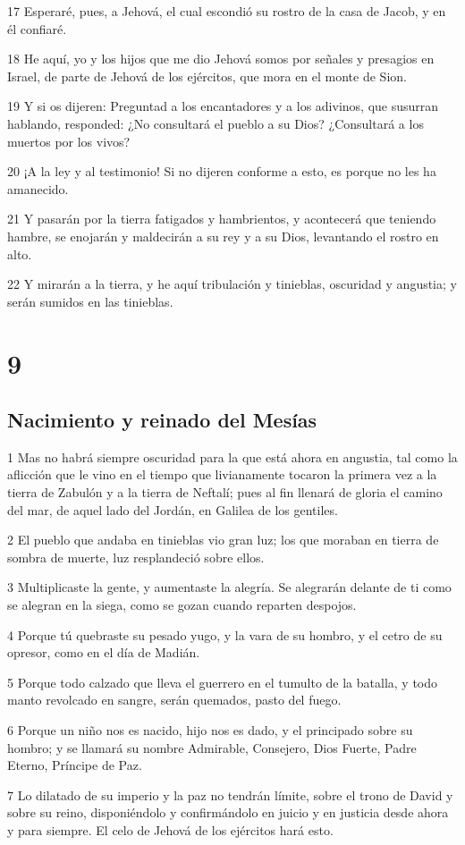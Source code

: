 \par 17 Esperaré, pues, a Jehová, el cual escondió su rostro de la casa de Jacob, y en él confiaré. 
\par 18 He aquí, yo y los hijos que me dio Jehová somos por señales y presagios en Israel, de parte de Jehová de los ejércitos, que mora en el monte de Sion.
\par 19 Y si os dijeren: Preguntad a los encantadores y a los adivinos, que susurran hablando, responded: ¿No consultará el pueblo a su Dios? ¿Consultará a los muertos por los vivos?
\par 20 ¡A la ley y al testimonio! Si no dijeren conforme a esto, es porque no les ha amanecido.
\par 21 Y pasarán por la tierra fatigados y hambrientos, y acontecerá que teniendo hambre, se enojarán y maldecirán a su rey y a su Dios, levantando el rostro en alto.
\par 22 Y mirarán a la tierra, y he aquí tribulación y tinieblas, oscuridad y angustia; y serán sumidos en las tinieblas.

\chapter{9}

\section*{Nacimiento y reinado del Mesías}

\par 1 Mas no habrá siempre oscuridad para la que está ahora en angustia, tal como la aflicción que le vino en el tiempo que livianamente tocaron la primera vez a la tierra de Zabulón y a la tierra de Neftalí; pues al fin llenará de gloria el camino del mar, de aquel lado del Jordán, en Galilea de los gentiles. 
\par 2 El pueblo que andaba en tinieblas vio gran luz; los que moraban en tierra de sombra de muerte, luz resplandeció sobre ellos. 
\par 3 Multiplicaste la gente, y aumentaste la alegría. Se alegrarán delante de ti como se alegran en la siega, como se gozan cuando reparten despojos.
\par 4 Porque tú quebraste su pesado yugo, y la vara de su hombro, y el cetro de su opresor, como en el día de Madián.
\par 5 Porque todo calzado que lleva el guerrero en el tumulto de la batalla, y todo manto revolcado en sangre, serán quemados, pasto del fuego.
\par 6 Porque un niño nos es nacido, hijo nos es dado, y el principado sobre su hombro; y se llamará su nombre Admirable, Consejero, Dios Fuerte, Padre Eterno, Príncipe de Paz.
\par 7 Lo dilatado de su imperio y la paz no tendrán límite, sobre el trono de David y sobre su reino, disponiéndolo y confirmándolo en juicio y en justicia desde ahora y para siempre. El celo de Jehová de los ejércitos hará esto.


